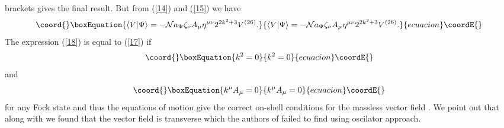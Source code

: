 \documentclass[a4paper,12pt]{article}
\begin{document}
brackets gives the final result.
But from (\ref{14}) and (\ref{15}) we have
\begin{equation}\coord{}\boxEquation{
\langle V|\Psi\rangle=
-\mathcal{N}a_\Psi \zeta_\nu A_\mu
\eta^{\mu\nu} 2^{2k^2+3}V^{(26)}.
\label{18}
}{
\langle V|\Psi\rangle=
-\mathcal{N}a_\Psi \zeta_\nu A_\mu
\eta^{\mu\nu} 2^{2k^2+3}V^{(26)}.
}{ecuacion}\coordE{}\end{equation}
The expression (\ref{18}) is equal to (\ref{17}) if
\begin{equation}\coord{}\boxEquation{
k^2=0 
\label{19}
}{
k^2=0 
}{ecuacion}\coordE{}\end{equation}
and
\begin{equation}\coord{}\boxEquation{
k^\mu A_\mu=0
\label{20}
}{
k^\mu A_\mu=0
}{ecuacion}\coordE{}\end{equation}
for any Fock state \myHighlight{$|\Psi\rangle$}\coordHE{} and thus the equations of motion
give the correct on-shell conditions
for the massless vector field \coordHE{}. We point out that along with \coordHE{} we
found that the vector field \coordHE{} is transverse which the authors of 
\cite{hk} failed to find using oscilator approach.
\end{document}
